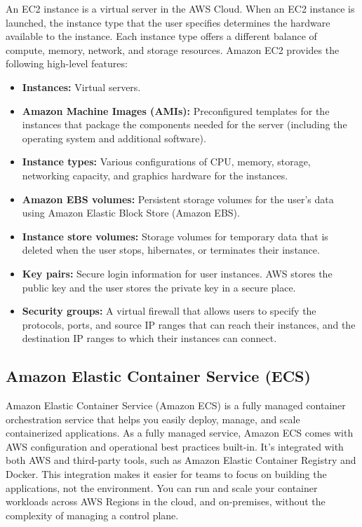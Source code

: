 		An EC2 instance is a virtual server in the AWS Cloud. When an EC2 instance is launched, the instance type that the 
		user specifies determines the hardware available to the instance. Each instance type offers a different balance of 
		compute, memory, network, and storage resources. Amazon EC2 provides the following high-level features:
		\begin{itemize}
			\item \textbf{Instances:} Virtual servers.
			\item \textbf{Amazon Machine Images (AMIs):} Preconfigured templates for the instances that package the components 
			needed for the server (including the operating system and additional software).
			\item \textbf{Instance types:} Various configurations of CPU, memory, storage, networking capacity, and graphics hardware for the instances.
			\item \textbf{Amazon EBS volumes:} Persistent storage volumes for the user's data using Amazon Elastic Block Store (Amazon EBS).
			\item \textbf{Instance store volumes:} Storage volumes for temporary data that is deleted when the user 
			stops, hibernates, or terminates their instance.
			\item \textbf{Key pairs:} Secure login information for user instances. AWS stores the public key and the user stores 
			the private key in a secure place.
			\item \textbf{Security groups:} A virtual firewall that allows users to specify the protocols, ports, and 
			source IP ranges that can reach their instances, and the destination IP ranges to which their instances can connect. 
		\end{itemize}

	\subsection{Amazon Elastic Container Service (ECS)}
		Amazon Elastic Container Service (Amazon ECS) \cite{ecs} is a fully managed container orchestration service that helps 
		you easily deploy, manage, and scale containerized applications. As a fully managed service, Amazon ECS comes 
		with AWS configuration and operational best practices built-in. It's integrated with both AWS and third-party tools, 
		such as Amazon Elastic Container Registry and Docker. This integration makes it easier for teams to focus on 
		building the applications, not the environment. You can run and scale your container workloads across AWS 
		Regions in the cloud, and on-premises, without the complexity of managing a control plane.

